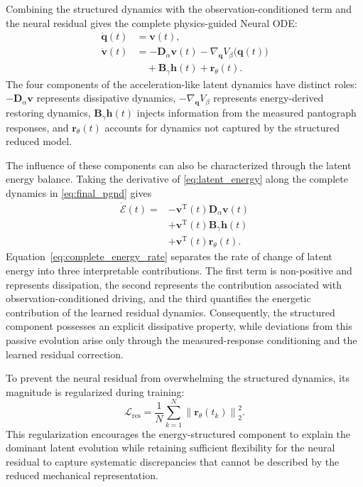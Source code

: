 \documentclass[journal,twoside]{IEEEtran}
\begin{document}
Combining the structured dynamics with the observation-conditioned term and
the neural residual gives the complete physics-guided Neural ODE:
\begin{equation}
\begin{aligned}
    \dot{\mathbf q}(t)
        &= \mathbf v(t),\\
    \dot{\mathbf v}(t)
        &=
        -\mathbf{D}_{\alpha}\mathbf v(t)
        -\nabla_{\mathbf q}V_{\beta}
        \big(\mathbf q(t)\big)\\
        &\quad
        +\mathbf{B}_{\gamma}\mathbf h(t)
        +\mathbf r_{\theta}(t).
\end{aligned}
\label{eq:final_pgnd}
\end{equation}
The four components of the acceleration-like latent dynamics have distinct
roles: $-\mathbf{D}_{\alpha}\mathbf v$ represents dissipative dynamics,
$-\nabla_{\mathbf q}V_{\beta}$ represents energy-derived restoring dynamics,
$\mathbf{B}_{\gamma}\mathbf h(t)$ injects information from the measured
pantograph responses, and $\mathbf r_{\theta}(t)$ accounts for dynamics not
captured by the structured reduced model.

The influence of these components can also be characterized through the
latent energy balance. Taking the derivative of
\eqref{eq:latent_energy} along the complete dynamics in
\eqref{eq:final_pgnd} gives
\begin{equation}
\begin{aligned}
    \dot{\mathcal{E}}(t)
    ={}&
    -\mathbf v^{\mathrm T}(t)
    \mathbf D_{\alpha}\mathbf v(t)\\
    &+
    \mathbf v^{\mathrm T}(t)
    \mathbf B_{\gamma}\mathbf h(t)\\
    &+
    \mathbf v^{\mathrm T}(t)
    \mathbf r_{\theta}(t).
\end{aligned}
\label{eq:complete_energy_rate}
\end{equation}
Equation~\eqref{eq:complete_energy_rate} separates the rate of change of
latent energy into three interpretable contributions. The first term is
non-positive and represents dissipation, the second represents the
contribution associated with observation-conditioned driving, and the third
quantifies the energetic contribution of the learned residual dynamics.
Consequently, the structured component possesses an explicit dissipative
property, while deviations from this passive evolution arise only through
the measured-response conditioning and the learned residual correction.

To prevent the neural residual from overwhelming the structured dynamics,
its magnitude is regularized during training:
\begin{equation}
    \mathcal{L}_{\mathrm{res}}
    =
    \frac{1}{N}
    \sum_{k=1}^{N}
    \left\|
        \mathbf r_{\theta}(t_k)
    \right\|_2^2.
    \label{eq:residual_loss}
\end{equation}
This regularization encourages the energy-structured component to explain the
dominant latent evolution while retaining sufficient flexibility for the
neural residual to capture systematic discrepancies that cannot be described
by the reduced mechanical representation.
\end{document}
